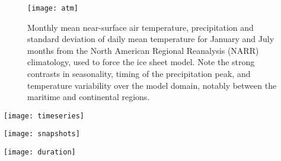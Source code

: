 \documentclass[tc, manuscript]{copernicus}
\begin{document}
\begin{figure}
  \texttt{[image: atm]}
  \caption{Monthly mean near-surface air temperature, precipitation and
           standard deviation of daily mean temperature for January and July
           months from the North American Regional Reanalysis (NARR)
           climatology, used to force the ice sheet model. Note the
           strong contrasts in seasonality, timing of the precipitation peak,
           and temperature variability over the model domain, notably between
           the maritime and continental regions.}
  \label{fig:atm}
\end{figure}

\begin{figure*}
  \texttt{[image: timeseries]}
  \caption{Temperature offset time-series from ice core and sediment core
           records (Table~\ref{tab:records}) used as palaeo-climate forcing for
           the ice sheet model \textbf{(top)}, and modelled ice volume
           through the last 120\,kyr, expressed in meters of sea-level
           equivalent \textbf{(bottom)}. Gray spans indicate Marine Isotope
           Stages (MIS) according to a global compilation of benthic
            records \citep{Lisiecki.Raymo.2005}. Hatched
           rectangles highlight modelled ice volume extrema corresponding to
           MIS~4 (61.9--55.4\,kyr), MIS~3 (52.2--45.6\,kyr), and
           MIS~2 (last glacial maximum, 29.5--16.9\,kyr). Dotted lines
           correspond to the GRIP and EPICA 6\,km-resolution runs.}
  \label{fig:timeseries}
\end{figure*}

\begin{figure*}
  \texttt{[image: snapshots]}
  \caption{Snapshots of modelled surface topography (500\,m contours)
           corresponding to the ice volume extrema indicated on
           Fig.~\ref{fig:timeseries}. Note the occurence of spatial similarities
           despite large differences in timing.}
  \label{fig:snapshots}
\end{figure*}

\begin{figure*}
  \texttt{[image: duration]}
  \caption{Modelled duration of ice cover during the last 120\,kyr.
           Note the irregular colour scale. A contiguous ice cover spanning
           from the Alaska Range (AR) to the southern Coast Mountains (CM) and
           Rocky Mountains (RM) exists for about 29\,kyr in both
           simulations. A central
           ice cover persists over the Skeena Mountains (SM) during most of the
           simulation. On the other hand, the maximal extent of the ice sheet
           generally corresponds to relatively short durations of ice cover.}
  \label{fig:duration}
\end{figure*}
\end{document}
